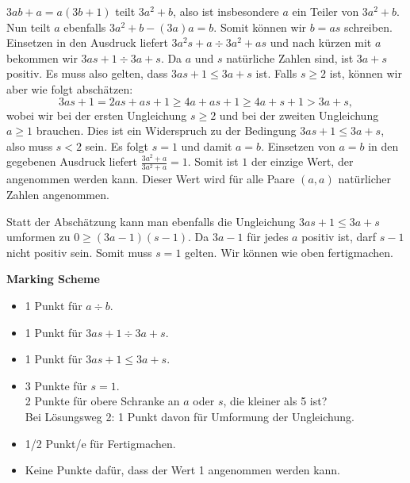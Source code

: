 \documentclass[language=german,style=solution]{smo}
\begin{document}
\begin{enumerate}
$3ab+a=a(3b+1)$ teilt $3a^2+b$, also ist insbesondere $a$ ein Teiler von $3a^2+b$. Nun teilt $a$ ebenfalls $3a^2+b-(3a)a=b$. Somit können wir $b=as$ schreiben. Einsetzen in den Ausdruck liefert $3a^2s+a\div 3a^2+as$ und nach kürzen mit $a$ bekommen wir $3as+1\div 3a+s$. Da $a$ und $s$ natürliche Zahlen sind, ist $3a+s$ positiv. Es muss also gelten, dass $3as+1\leq 3a+s$ ist. Falls $s\geq2$ ist, können wir aber wie folgt abschätzen:
\[
3as+1=2as+as+1\geq 4a+as+1\geq 4a+s+1>3a+s, 
\]
wobei wir bei der ersten Ungleichung $s\geq 2$ und bei der zweiten Ungleichung $a\geq 1$ brauchen. Dies ist ein Widerspruch zu der Bedingung $3as+1\leq 3a+s$, also muss $s<2$ sein. Es folgt $s=1$ und damit $a=b$. Einsetzen von $a=b$ in den gegebenen Ausdruck liefert $\frac{3a^2+a}{3a^2+a}=1$. Somit ist $1$ der einzige Wert, der angenommen werden kann. Dieser Wert wird für alle Paare $(a,a)$ natürlicher Zahlen angenommen.

Statt der Abschätzung kann man ebenfalls die Ungleichung $3as+1\leq 3a+s$ umformen zu $0\geq (3a-1)(s-1)$. Da $3a-1$ für jedes $a$ positiv ist, darf $s-1$ nicht positiv sein. Somit muss $s=1$ gelten. Wir können wie oben fertigmachen.

\textbf{Marking Scheme}
\begin{itemize}
	\item 1 Punkt für $a\div b$.
	\item 1 Punkt für $3as+1\div 3a+s$.
	\item 1 Punkt für $3as+1\leq 3a+s$.
	\item 3 Punkte für $s=1$. \\2 Punkte für obere Schranke an $a$ oder $s$, die kleiner als 5 ist? \\Bei Lösungsweg 2: 1 Punkt davon für Umformung der Ungleichung.
	\item 1/2 Punkt/e für Fertigmachen.
	\item Keine Punkte dafür, dass der Wert 1 angenommen werden kann.
\end{itemize}

\newpage

\end{enumerate}
\end{document}
